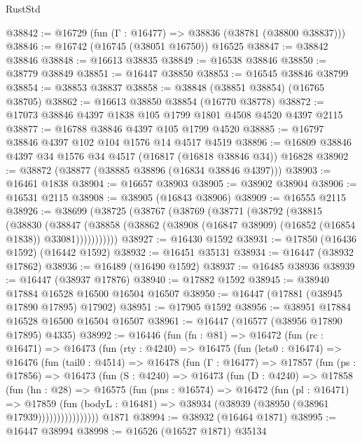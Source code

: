 \begin{lexlean}{RustStd}
\begin{coremodule}
@38842 := @16729 (fun (Γ : @16477) => @38836 (@38781 (@38800 @38837)))
@38846 := @16742 (@16745 (@38051 @16750)) @16525
@38847 := @38842 @38846
@38848 := @16613 @38835
@38849 := @16538 @38846
@38850 := @38779 @38849
@38851 := @16447 @38850
@38853 := @16545 @38846 @38799
@38854 := @38853 @38837
@38858 := @38848 (@38851 @38854) (@16765 @38705)
@38862 := @16613 @38850 @38854 (@16770 @38778)
@38872 := @17073 @38846 @4397 @1838 @105 @1799 @1801 @4508 @4520 @4397 @2115
@38877 := @16788 @38846 @4397 @105 @1799 @4520
@38885 := @16797 @38846 @4397 @102 @104 @1576 @14 @4517 @4519
@38896 := @16809 @38846 @4397 @34 @1576 @34 @4517 (@16817 (@16818 @38846 @34)) @16828
@38902 := @38872 (@38877 (@38885 @38896 (@16834 @38846 @4397)))
@38903 := @16461 @1838
@38904 := @16657 @38903
@38905 := @38902 @38904
@38906 := @16531 @2115
@38908 := @38905 (@16843 @38906)
@38909 := @16555 @2115
@38926 := @38699
    (@38725
      (@38767
        (@38769
          (@38771
            (@38792
              (@38815
                (@38830
                  (@38847
                    (@38858
                      (@38862 (@38908 (@16847 @38909) (@16852 (@16854 @1838)) @33081)))))))))))
@38927 := @16430 @1592
@38931 := @17850 (@16436 @1592) (@16442 @1592)
@38932 := @16451 @35131
@38934 := @16447 (@38932 @17862)
@38936 := @16489 (@16490 @1592)
@38937 := @16485 @38936
@38939 := @16447 (@38937 @17876)
@38940 := @17882 @1592
@38945 := @38940 @17884 @16528 @16500 @16504 @16507
@38950 := @16447 (@17881 (@38945 @17890 @17895) @17902)
@38951 := @17905 @1592
@38956 := @38951 @17884 @16528 @16500 @16504 @16507
@38961 := @16447 (@16577 (@38956 @17890 @17895) @4335)
@38992 := @16446
    (fun (fn : @81) =>
    @16472
      (fun (rc : @16471) =>
      @16473
        (fun (rty : @4240) =>
        @16475
          (fun (lets0 : @16474) =>
          @16476
            (fun (tail0 : @4514) =>
            @16478
              (fun (Γ : @16477) =>
              @17857
                (fun (ps : @17856) =>
                @16473
                  (fun (S : @4240) =>
                  @16473
                    (fun (D : @4240) =>
                    @17858
                      (fun (hn : @28) =>
                      @16575
                        (fun (pns : @16574) =>
                        @16472
                          (fun (pl : @16471) =>
                          @17859
                            (fun (bodyL : @16481) =>
                            @38934 (@38939 (@38950 (@38961 @17939))))))))))))))))
    @1871
@38994 := @38932 (@16464 @1871)
@38995 := @16447 @38994
@38998 := @16526 (@16527 @1871) @35134

\end{coremodule}
\end{lexlean}
